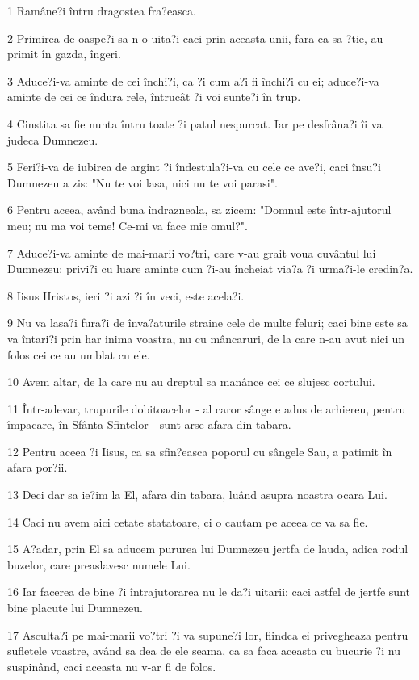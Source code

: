 \par 1 Ramâne?i întru dragostea fra?easca.
\par 2 Primirea de oaspe?i sa n-o uita?i caci prin aceasta unii, fara ca sa ?tie, au primit în gazda, îngeri.
\par 3 Aduce?i-va aminte de cei închi?i, ca ?i cum a?i fi închi?i cu ei; aduce?i-va aminte de cei ce îndura rele, întrucât ?i voi sunte?i în trup.
\par 4 Cinstita sa fie nunta întru toate ?i patul nespurcat. Iar pe desfrâna?i îi va judeca Dumnezeu.
\par 5 Feri?i-va de iubirea de argint ?i îndestula?i-va cu cele ce ave?i, caci însu?i Dumnezeu a zis: "Nu te voi lasa, nici nu te voi parasi".
\par 6 Pentru aceea, având buna îndrazneala, sa zicem: "Domnul este într-ajutorul meu; nu ma voi teme! Ce-mi va face mie omul?".
\par 7 Aduce?i-va aminte de mai-marii vo?tri, care v-au grait voua cuvântul lui Dumnezeu; privi?i cu luare aminte cum ?i-au încheiat via?a ?i urma?i-le credin?a.
\par 8 Iisus Hristos, ieri ?i azi ?i în veci, este acela?i.
\par 9 Nu va lasa?i fura?i de înva?aturile straine cele de multe feluri; caci bine este sa va întari?i prin har inima voastra, nu cu mâncaruri, de la care n-au avut nici un folos cei ce au umblat cu ele.
\par 10 Avem altar, de la care nu au dreptul sa manânce cei ce slujesc cortului.
\par 11 Într-adevar, trupurile dobitoacelor - al caror sânge e adus de arhiereu, pentru împacare, în Sfânta Sfintelor - sunt arse afara din tabara.
\par 12 Pentru aceea ?i Iisus, ca sa sfin?easca poporul cu sângele Sau, a patimit în afara por?ii.
\par 13 Deci dar sa ie?im la El, afara din tabara, luând asupra noastra ocara Lui.
\par 14 Caci nu avem aici cetate statatoare, ci o cautam pe aceea ce va sa fie.
\par 15 A?adar, prin El sa aducem pururea lui Dumnezeu jertfa de lauda, adica rodul buzelor, care preaslavesc numele Lui.
\par 16 Iar facerea de bine ?i întrajutorarea nu le da?i uitarii; caci astfel de jertfe sunt bine placute lui Dumnezeu.
\par 17 Asculta?i pe mai-marii vo?tri ?i va supune?i lor, fiindca ei privegheaza pentru sufletele voastre, având sa dea de ele seama, ca sa faca aceasta cu bucurie ?i nu suspinând, caci aceasta nu v-ar fi de folos.
